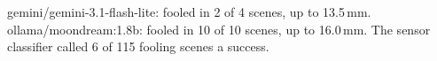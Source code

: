 gemini/gemini-3.1-flash-lite: fooled in 2 of 4 scenes, up to 13.5\,mm. ollama/moondream:1.8b: fooled in 10 of 10 scenes, up to 16.0\,mm. The sensor classifier called 6 of 115 fooling scenes a success.
